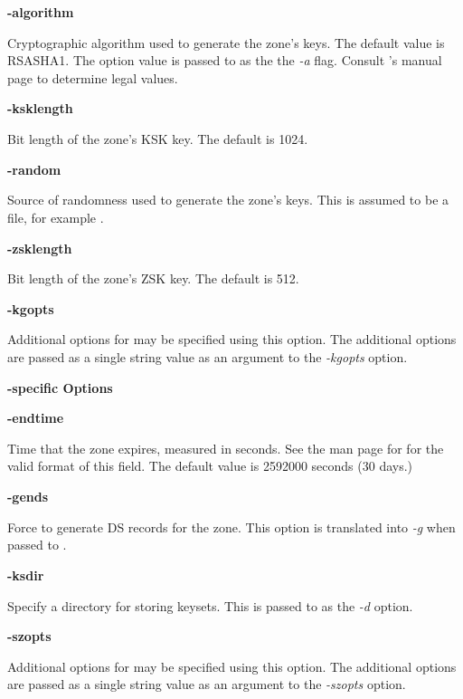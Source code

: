 \begin{description}

\item {\bf -algorithm}\verb" "

Cryptographic algorithm used to generate the zone's keys.  The default value
is RSASHA1.  The option value is passed to  as the the {\it
-a} flag.  Consult 's manual page to determine legal values.

\item {\bf -ksklength}\verb" "

Bit length of the zone's KSK key.
The default is 1024.

\item {\bf -random}\verb" "

Source of randomness used to generate the zone's keys.  This is assumed to be
a file, for example .

\item {\bf -zsklength}\verb" "

Bit length of the zone's ZSK key.
The default is 512.

\item {\bf -kgopts}\verb" "

Additional options for  may be specified using this option.
The additional options are passed as a single string value as an argument to
the {\it -kgopts} option.

\end{description}

{\bf {}-specific Options}

\begin{description}

\item {\bf -endtime}\verb" "

Time that the zone expires, measured in seconds.  See the man page for
 for the valid format of this field.
The default value is 2592000 seconds (30 days.)

\item {\bf -gends}\verb" "

Force  to generate DS records for the zone.  This option
is translated into {\it -g} when passed to .

\item {\bf -ksdir}\verb" "

Specify a directory for storing keysets.  This is passed to
 as the {\it -d} option.

\item {\bf -szopts}\verb" "

Additional options for  may be specified using this
option.  The additional options are passed as a single string value as an
argument to the {\it -szopts} option.

\end{description}

